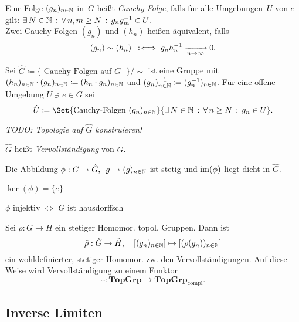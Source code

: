 \documentclass{cheat-sheet}
\newcommand{\clos}[1]{\overline{#1}} %
\newcommand{\TopGrp}{\mathbf{TopGrp}} %
\newcommand{\ComplTopGrp}{\mathbf{TopGrp}_{\text{compl}}} %
\begin{document}
\begin{defn}
  Eine Folge $(g_n)_{n \in \mathbb{N}}$ in~$G$  heißt \emph{Cauchy-Folge}, falls für alle Umgebungen~$U$ von $e$ gilt: $\exists \, {N \in \mathbb{N}} \,:\, \forall \, {n, m \geq N} \,:\, g_n g_m^{-1} \in U$. \\
  Zwei Cauchy-Folgen $(g_n)$ und $(h_n)$ heißen äquivalent, falls
  \[
    (g_n) \sim (h_n) \enspace:\!\iff g_n h_n^{-1} \xrightarrow[n \to \infty]{} 0.
  \]
\end{defn}

\begin{konstr}
  Sei $\hat{G} \coloneqq \{ \text{ Cauchy-Folgen auf $G$ } \} / {\sim}$ ist eine Gruppe mit $(h_n)_{n \in \mathbb{N}} \cdot (g_n)_{n \in \mathbb{N}} \coloneqq (h_n \cdot g_n)_{n \in \mathbb{N}}$ und $(g_n)_{n \in \mathbb{N}}^{-1} \coloneqq (g_n^{-1})_{n \in \mathbb{N}}$.
  Für eine offene Umgebung $U \ni e \in G$ sei
  \[
    \hat{U} \coloneqq \Set{\text{Cauchy-Folgen } (g_n)_{n \in \N}}{\ex{N \in \N} \fa{n \geq N} g_n \in U}.
  \]
\end{konstr}

\emph{TODO: Topologie auf $\hat{G}$ konstruieren!}

\begin{defn}
  $\hat{G}$ heißt \emph{Vervollständigung} von $G$.
\end{defn}

\begin{bem}
  Die Abbildung $\phi : G \to \hat{G}, \enspace g \mapsto (g)_{n \in \mathbb{N}}$ ist stetig und $\operatorname{im}(\phi)$ liegt dicht in $\hat{G}$.
\end{bem}

\begin{lem}
  $\ker(\phi) = \clos{\{ e \}}$
\end{lem}

\begin{kor}
  $\phi$ injektiv $\iff$ $G$ ist hausdorffsch
\end{kor}

\begin{bem}
  Sei $\rho \!:\! G \to H$ ein stetiger Homomor. topol. Gruppen.
  Dann ist
  \[
    \hat{\rho} : \hat{G} \to \hat{H}, \quad
    [(g_n)_{n \in \mathbb{N}}] \mapsto [(\rho(g_n))_{n \in \mathbb{N}}]
  \]
  ein wohldefinierter, stetiger Homomor. zw. den Vervollständigungen.
  Auf diese Weise wird Vervollständigung zu einem Funktor
  \[
    \widehat{\enspace} : \TopGrp \to \ComplTopGrp.
  \]
\end{bem}

\subsection{Inverse Limiten}
\end{document}
